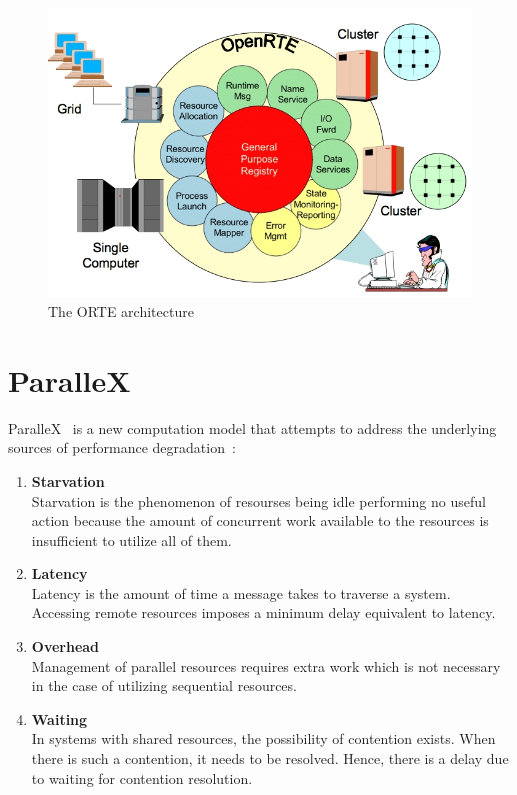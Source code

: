 \begin{figure}[h!]
\centering
\includegraphics[scale=0.5]{images/orte.png}
\caption{The ORTE architecture~\cite{hpcwire}}
\label{fig:orte-architecture}
\end{figure}

\section{ParalleX}
\label{sec:parallex}
ParalleX~\cite{kaiser2009parallex} is a new computation model that attempts to address the underlying sources of performance degradation~\cite{sterling2010enabling}:

\begin{enumerate}
\item \textbf{Starvation}\\
  Starvation is the phenomenon of resourses being idle performing no useful action because the amount of concurrent work available to the resources is insufficient to utilize all of them.
\item \textbf{Latency}\\
  Latency is the amount of time a message takes to traverse a system. Accessing remote resources imposes a minimum delay equivalent to latency.
\item \textbf{Overhead}\\
  Management of parallel resources requires extra work which is not necessary in the case of utilizing sequential resources.
\item \textbf{Waiting}\\
  In systems with shared resources, the possibility of contention exists. When there is such a contention, it needs to be resolved. Hence, there is a delay due to waiting for contention resolution.
\end{enumerate}

